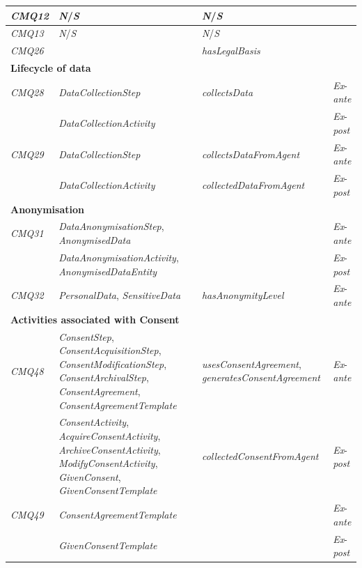 \begin{table}
\begin{tabularx}{\textwidth}{|l|X|p{5cm}|l|}
\textit{CMQ12} & \textit{N}/\textit{S} & \textit{N}/\textit{S} &  \\ \hline
\textit{CMQ13} & \textit{N}/\textit{S} & \textit{N}/\textit{S} &  \\ \hline
\textit{CMQ26} &  & \textit{hasLegalBasis} &  \\ \hline
\multicolumn{4}{|l|}{\textbf{Lifecycle of data}} \\ \hline
\textit{CMQ28} & \textit{DataCollectionStep} & \textit{collectsData} & \textit{Ex}-\textit{ante} \\ \hline
 & \textit{DataCollectionActivity} &  & \textit{Ex}-\textit{post} \\ \hline
\textit{CMQ29} & \textit{DataCollectionStep} & \textit{collectsDataFromAgent} & \textit{Ex}-\textit{ante} \\ \hline
 & \textit{DataCollectionActivity} & \textit{collectedDataFromAgent} & \textit{Ex}-\textit{post} \\ \hline
\multicolumn{4}{|l|}{\textbf{Anonymisation}} \\ \hline
\textit{CMQ31} & \textit{DataAnonymisationStep}, \textit{AnonymisedData} &  & \textit{Ex}-\textit{ante} \\ \hline
 & \textit{DataAnonymisationActivity}, \textit{AnonymisedDataEntity} &  & \textit{Ex}-\textit{post} \\ \hline
\textit{CMQ32} & \textit{PersonalData}, \textit{SensitiveData} & \textit{hasAnonymityLevel} & \textit{Ex}-\textit{ante} \\ \hline
\multicolumn{4}{|l|}{\textbf{Activities associated with Consent}} \\ \hline
\textit{CMQ48} & \textit{ConsentStep}, \textit{ConsentAcquisitionStep}, \textit{ConsentModificationStep}, \textit{ConsentArchivalStep}, \textit{ConsentAgreement}, \textit{ConsentAgreementTemplate} & \textit{usesConsentAgreement}, \textit{generatesConsentAgreement} & \textit{Ex}-\textit{ante} \\ \hline
 & \textit{ConsentActivity}, \textit{AcquireConsentActivity}, \textit{ArchiveConsentActivity}, \textit{ModifyConsentActivity}, \textit{GivenConsent}, \textit{GivenConsentTemplate} & \textit{collectedConsentFromAgent} & \textit{Ex}-\textit{post} \\ \hline
\textit{CMQ49} & \textit{ConsentAgreementTemplate} &  & \textit{Ex}-\textit{ante} \\ \hline
 & \textit{GivenConsentTemplate} &  & \textit{Ex}-\textit{post} \\ \hline
\end{tabularx}
\label{table:gdprov:cq}
\end{table}

